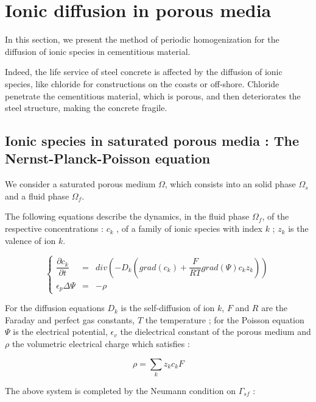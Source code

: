\section{Ionic diffusion in porous media}\label{hom_d}

In this section, we present the method of periodic homogenization for the diffusion of ionic species in cementitious material.

\par
Indeed, the life service of steel concrete is affected by the diffusion of ionic species, %
like chloride for constructions on the coasts or off-shore. %
Chloride penetrate the cementitious material, which is porous, and then deteriorates the steel structure, making the concrete fragile.

\subsection{Ionic species in saturated porous media : The Nernst-Planck-Poisson equation}

We consider a saturated porous medium $\Omega$, which consists into an solid phase $\Omega_s$ and a fluid phase $\Omega_f$.

\par
The following equations describe the dynamics, in the fluid phase $\Omega_f$, of the respective concentrations : $c_k$ , of a family of ionic species with index $k$ ; %
$z_k$ is the valence of ion $k$.

\begin{equation}\label{npp_f}
\left\{%
\begin{array}{lcl}
\dfrac{\partial{c_k}}{\partial{t}}&=&div\left(-D_k\left(grad(c_k)+\dfrac{F}{RT}grad(\Psi)c_k z_k\right)\right)\\
\epsilon_p \Delta \Psi&=&-\rho
\end{array}
\right.
\end{equation}

For the diffusion equations $D_k$ is the self-diffusion of ion $k$, $F$ and $R$ are the Faraday and perfect gas constants, $T$ the temperature ; %
for the Poisson equation $\Psi$ is the electrical potential, $\epsilon_v$ the dielectrical constant of the porous medium and $\rho$ the volumetric electrical charge which satisfies :

\[\rho=\sum\limits_k z_k c_k F\]

The above system is completed by the Neumann condition on $\Gamma_{sf}$ :

